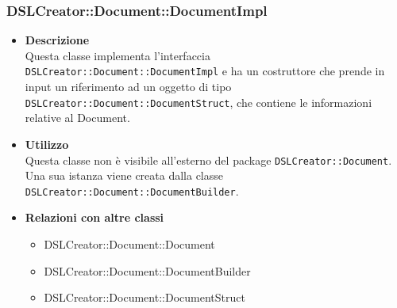  \subsubsection{DSLCreator::Document::DocumentImpl}
                    \begin{itemize}
                        \item \textbf{Descrizione} \hfill \\
                            Questa classe implementa l'interfaccia \texttt{DSLCreator::Document::DocumentImpl} e ha un costruttore che prende in input un riferimento ad un oggetto di tipo \texttt{DSLCrea\-tor::Document::DocumentStruct}, che contiene le informazioni relative al Document.
                        \item \textbf{Utilizzo} \hfill \\
                            Questa classe non è visibile all'esterno del package \texttt{DSLCreator::Document}. Una sua istanza viene creata dalla classe \texttt{DSLCreator::Document::DocumentBuilder}.
                        \item \textbf{Relazioni con altre classi}
                            \begin{itemize}
                              \item DSLCreator::Document::Document
                              \item DSLCreator::Document::DocumentBuilder
                              \item DSLCreator::Document::DocumentStruct
                            \end{itemize}
                    \end{itemize}

